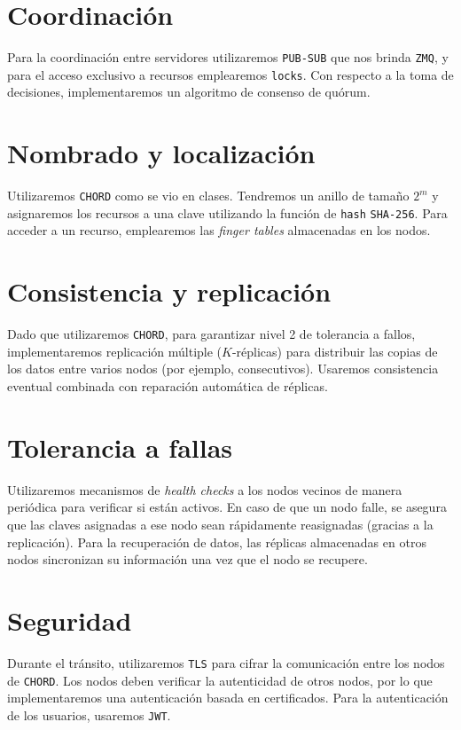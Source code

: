\documentclass[11pt,a4paper]{article}
\begin{document}
\section{Coordinaci\'on}
Para la coordinaci\'on entre servidores utilizaremos \texttt{PUB-SUB} que nos brinda \texttt{ZMQ}, y para el acceso exclusivo a recursos emplearemos \texttt{locks}. Con respecto a la toma de decisiones, implementaremos un algoritmo de consenso de quórum.

\section{Nombrado y localizaci\'on}
Utilizaremos \texttt{CHORD} como se vio en clases. Tendremos un anillo de tamaño $2^m$ y asignaremos los recursos a una clave utilizando la funci\'on de \texttt{hash} \texttt{SHA-256}. Para acceder a un recurso, emplearemos las \textit{finger tables} almacenadas en los nodos.

\section{Consistencia y replicaci\'on}
Dado que utilizaremos \texttt{CHORD}, para garantizar nivel 2 de tolerancia a fallos, implementaremos replicaci\'on m\'ultiple (\(K\)-réplicas) para distribuir las copias de los datos entre varios nodos (por ejemplo, consecutivos). Usaremos consistencia eventual combinada con reparaci\'on autom\'atica de r\'eplicas.

\section{Tolerancia a fallas}
Utilizaremos mecanismos de \textit{health checks} a los nodos vecinos de manera peri\'odica para verificar si est\'an activos. En caso de que un nodo falle, se asegura que las claves asignadas a ese nodo sean rápidamente reasignadas (gracias a la replicaci\'on). Para la recuperaci\'on de datos, las réplicas almacenadas en otros nodos sincronizan su informaci\'on una vez que el nodo se recupere.

\section{Seguridad}
Durante el tránsito, utilizaremos \texttt{TLS} para cifrar la comunicaci\'on entre los nodos de \texttt{CHORD}. Los nodos deben verificar la autenticidad de otros nodos, por lo que implementaremos una autenticaci\'on basada en certificados. Para la autenticaci\'on de los usuarios, usaremos \texttt{JWT}.
\end{document}
